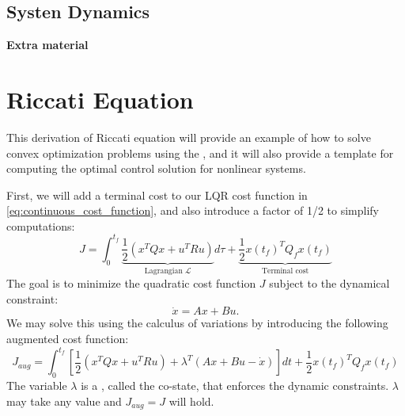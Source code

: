 \documentclass[a4 paper]{article}
\begin{document}
\subsection{Systen Dynamics}




\newpage
\textbf{\huge{Extra material}}
\section{Riccati Equation}\label{sec:riccati}

This derivation of Riccati equation will provide an example of how to solve convex optimization problems using the , 
and it will also provide a template for computing the optimal control solution for nonlinear systems. 

First, we will add a terminal cost to our LQR cost function in \ref{eq:continuous_cost_function}, 
and also introduce a factor of 1/2 to simplify computations:
\begin{equation}
    J = \int_{0}^{t_f} \underbrace{\frac{1}{2} \left( x^T Q x + u^T R u \right)}_\text{Lagrangian $\mathcal{L}$} d\tau + 
        \underbrace{\frac{1}{2} x(t_f)^T Q_f x(t_f)}_\text{Terminal cost}
\label{eq:cost_function}
\end{equation}
The goal is to minimize the quadratic cost function \( J \) subject to the dynamical constraint:
\begin{equation}
    \dot{x} = A x + B u.
\label{eq:dynamic_constraint}
\end{equation}
We may solve this using the calculus of variations by introducing the following augmented cost function:
\begin{equation}
    J_{aug} = \int_{0}^{t_f} \left[ \frac{1}{2} \left( x^T Q x + u^T R u \right) + \lambda^T (A x + B u - \dot{x}) \right] 
    dt + \frac{1}{2} x(t_f)^T Q_f x(t_f)
\label{eq:augmented_cost_function}
\end{equation}
The variable \( \lambda \) is a , called the co-state, that enforces the dynamic constraints. \( \lambda \) may 
take any value and \( J_{aug} = J \) will hold.
\end{document}
